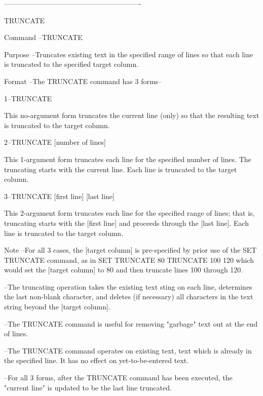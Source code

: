 ----------------------------------------------------------
 
TRUNCATE
 
Command --TRUNCATE
 
Purpose --Truncates existing text in the specified range
          of lines so that each line is truncated to
          the specified target column.
 
Format  --The TRUNCATE command has 3 forms--
 
       1--TRUNCATE
 
          This no-argument form truncates the current
          line (only) so that the resulting text
          is truncated to the target column.
 
       2--TRUNCATE     [number of lines]
 
          This 1-argument form truncates each line
          for the specified number of lines.  The
          truncating starts with the current line.
          Each line is truncated to the target column.
 
       3--TRUNCATE   [first line]   [last line]
 
          This 2-argument form truncates each line
          for the specified range of lines; that is,
          truncating starts with the   [first line]
          and proceeds through the   [last line].
          Each line is truncated to the target column.
 
Note    --For all 3 cases, the    [target column]
          is pre-specified by prior use of the
          SET TRUNCATE command, as in
             SET TRUNCATE 80
             TRUNCATE 100 120
          which would set the [target column] to 80
          and then truncate lines 100 through 120.
 
        --The truncating operation takes the existing
          text sting on each line, determines the last
          non-blank character, and deletes (if necessary)
          all characters in the text string beyond
          the     [target column].
 
        --The TRUNCATE command is useful for removing
          "garbage" text out at the end of lines.
 
        --The TRUNCATE command operates on existing text,
          text which is already in the specified line.
          It has no effect on yet-to-be-entered text.
 
        --For all 3 forms, after the TRUNCATE command
          has been executed, the "current line" is
          updated to be the last line truncated.
 
